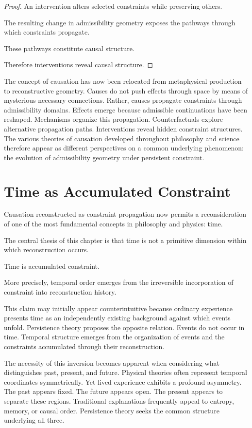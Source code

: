 \documentclass[12pt,oneside]{article}
\theoremstyle{definition}
\begin{document}
\begin{proof}

An intervention alters selected constraints while preserving others.

The resulting change in admissibility geometry exposes the pathways through which constraints propagate.

These pathways constitute causal structure.

Therefore interventions reveal causal structure.

\end{proof}

The concept of causation has now been relocated from metaphysical production to reconstructive geometry. Causes do not push effects through space by means of mysterious necessary connections. Rather, causes propagate constraints through admissibility domains. Effects emerge because admissible continuations have been reshaped. Mechanisms organize this propagation. Counterfactuals explore alternative propagation paths. Interventions reveal hidden constraint structures. The various theories of causation developed throughout philosophy and science therefore appear as different perspectives on a common underlying phenomenon: the evolution of admissibility geometry under persistent constraint.

\section{Time as Accumulated Constraint}

Causation reconstructed as constraint propagation now permits a reconsideration of one of the most fundamental concepts in philosophy and physics: time.

The central thesis of this chapter is that time is not a primitive dimension within which reconstruction occurs.

Time is accumulated constraint.

More precisely, temporal order emerges from the irreversible incorporation of constraint into reconstruction history.

This claim may initially appear counterintuitive because ordinary experience presents time as an independently existing background against which events unfold. Persistence theory proposes the opposite relation. Events do not occur in time. Temporal structure emerges from the organization of events and the constraints accumulated through their reconstruction.

The necessity of this inversion becomes apparent when considering what distinguishes past, present, and future. Physical theories often represent temporal coordinates symmetrically. Yet lived experience exhibits a profound asymmetry. The past appears fixed. The future appears open. The present appears to separate these regions. Traditional explanations frequently appeal to entropy, memory, or causal order. Persistence theory seeks the common structure underlying all three.
\end{document}
